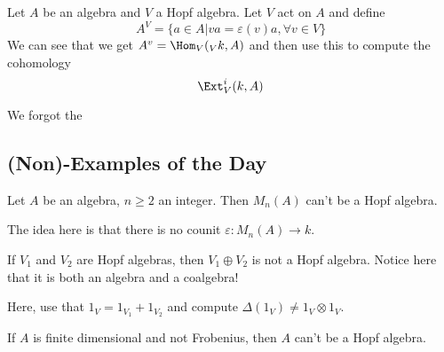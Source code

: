 \documentclass[12pt]{article}
\begin{document}
Let $A$ be an algebra and $V$ a Hopf algebra. Let $V$ act on $A$ and define
\[A^V=\{a\in A|va=\varepsilon(v)a,\forall v\in V\}\]
We can see that we get $A^v=\Hom_V({_Vk},A)$ and then use this to compute the cohomology
\[\Ext_V^i(k,A)\]

We forgot the
\subsection{(Non)-Examples of the Day}
\begin{ex}
	Let $A$ be an algebra, $n\ge 2$ an integer. Then $M_n(A)$ can't be a Hopf algebra.

	The idea here is that there is no counit $\varepsilon:M_n(A)\to k$.
\end{ex}
\begin{ex}
	If $V_1$ and $V_2$ are Hopf algebras, then $V_1\oplus V_2$ is not a Hopf algebra.
	Notice here that it is both an algebra and a coalgebra!

	Here, use that $1_V=1_{V_1}+1_{V_2}$ and compute $\Delta(1_V)\ne 1_V\otimes 1_V$.
\end{ex}
\begin{ex}
	If $A$ is finite dimensional and not Frobenius, then $A$ can't be a Hopf algebra.
\end{ex}
\end{document}
